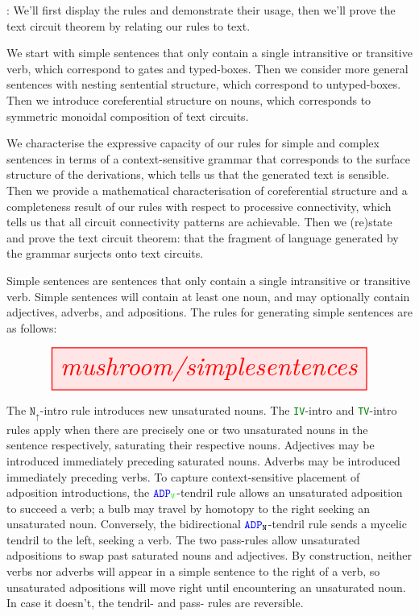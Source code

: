 : We'll first display the rules and demonstrate their usage, then we'll prove the text circuit theorem by relating our rules to text.

 We start with simple sentences that only contain a single intransitive or transitive verb, which correspond to gates and typed-boxes. Then we consider more general sentences with nesting sentential structure, which correspond to untyped-boxes. Then we introduce coreferential structure on nouns, which corresponds to symmetric monoidal composition of text circuits.

 We characterise the expressive capacity of our rules for simple and complex sentences in terms of a context-sensitive grammar that corresponds to the surface structure of the derivations, which tells us that the generated text is sensible. Then we provide a mathematical characterisation of coreferential structure and a completeness result of our rules with respect to processive connectivity, which tells us that all circuit connectivity patterns are achievable. Then we (re)state and prove the text circuit theorem: that the fragment of language generated by the grammar surjects onto text circuits.

\clearpage

\begin{myboxB}
\begin{rules}\label{rules:simp}
Simple sentences are sentences that only contain a single intransitive or transitive verb. Simple sentences will contain at least one noun, and may optionally contain adjectives, adverbs, and adpositions. The rules for generating simple sentences are as follows:

\[
\resizebox{0.9\textwidth}{!}{\tikzfig{mushroom/simplesentences}}
\]

The $\texttt{N}_\uparrow$-intro rule introduces new unsaturated nouns. The \textcolor{green}{\texttt{IV}}-intro and \textcolor{green}{\texttt{TV}}-intro rules apply when there are precisely one or two unsaturated nouns in the sentence respectively, saturating their respective nouns. Adjectives may be introduced immediately preceding saturated nouns. Adverbs may be introduced immediately preceding verbs. To capture context-sensitive placement of adposition introductions, the $\textcolor{blue}{\texttt{ADP}}_{\textcolor{green}{\texttt{V}}}$-tendril rule allows an unsaturated adposition to succeed a verb; a bulb may travel by homotopy to the right seeking an unsaturated noun. Conversely, the bidirectional $\textcolor{blue}{\texttt{ADP}}_{\texttt{N}}$-tendril rule sends a mycelic tendril to the left, seeking a verb. The two pass-rules allow unsaturated adpositions to swap past saturated nouns and adjectives. By construction, neither verbs nor adverbs will appear in a simple sentence to the right of a verb, so unsaturated adpositions will move right until encountering an unsaturated noun. In case it doesn't, the tendril- and pass- rules are reversible.
\end{rules}
\end{myboxB}
\clearpage

